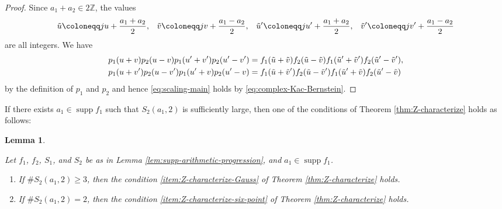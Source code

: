 \documentclass[12pt]{article}
\newtheorem{lemma}[theorem]{Lemma}
\theoremstyle{definition}
\theoremstyle{remark}
\numberwithin{equation}{section}
\numberwithin{figure}{section}
\numberwithin{table}{section}
\DeclareMathOperator{\supp}{supp}
\begin{document}
\begin{proof}

Since $ a_1 + a_2 \in 2 \mathbb{ Z } $, the values
\begin{align}
    \Tilde{ u } \coloneqq j u + \frac{ a_1 + a_2 }{ 2 }, & &
    \Tilde{ v } \coloneqq j v + \frac{ a_1 - a_2 }{ 2 }, & &
    \Tilde{ u }' \coloneqq j u' + \frac{ a_1 + a_2 }{ 2 }, & &
    \Tilde{ v }' \coloneqq j v' + \frac{ a_1 - a_2 }{ 2 }
\end{align}
are all integers.
We have
\begin{align}
    p_1 ( u + v ) p_2 ( u - v ) p_1 ( u' + v' ) p_2 ( u' - v' )
    & = f_1 ( \Tilde{ u } + \Tilde{ v } ) f_2 ( \Tilde{ u } - \Tilde{ v } ) f_1 ( \Tilde{ u }' + \Tilde{ v }' ) f_2 ( \Tilde{ u }' - \Tilde{ v }' ), \\
    p_1 ( u + v' ) p_2 ( u - v' ) p_1 ( u' + v ) p_2 ( u' - v )
    & = f_1 ( \Tilde{ u } + \Tilde{ v }' ) f_2 ( \Tilde{ u } - \Tilde{ v }' ) f_1 ( \Tilde{ u }' + \Tilde{ v } ) f_2 ( \Tilde{ u }' - \Tilde{ v } )
\end{align}
by the definition of $ p_1 $ and $ p_2 $ and hence \eqref{eq:scaling-main} holds by \eqref{eq:complex-Kac-Bernstein}.
\end{proof}

If there exists $ a_1 \in \supp f_1 $ such that $ S_2 ( a_1 , 2 ) $ is sufficiently large, then one of the conditions of Theorem \ref{thm:Z-characterize} holds as follows:

\begin{lemma}
    \label{lem:supp-large-Gauss}

Let $ f_1$, $ f_2 $, $ S_1$, and $ S_2 $ be as in Lemma \ref{lem:supp-arithmetic-progression}, and $ a_1 \in \supp f_1 $.

\begin{enumerate}
    \item \label{item:supp-large-Gauss-large}

If $ \# S_2 ( a_1 , 2 ) \geq 3 $, then the condition \ref{item:Z-characterize-Gauss} of Theorem \ref{thm:Z-characterize} holds.

\item \label{item:supp-large-Gauss-number-2}

If $ \# S_2 ( a_1 , 2 ) = 2 $, then the condition \ref{item:Z-characterize-six-point} of Theorem \ref{thm:Z-characterize} holds.
    
\end{enumerate}

\end{lemma}
\end{document}
